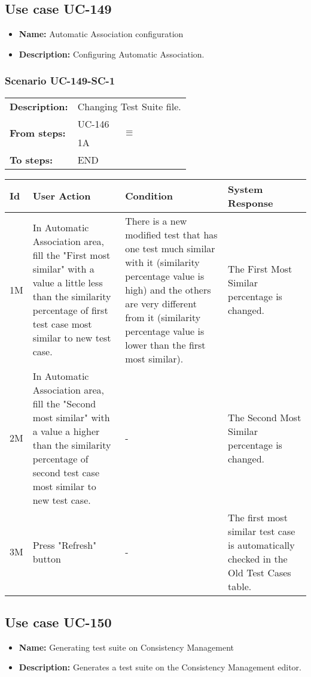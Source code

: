 \documentclass[a4paper,11pt]{article}
\newcommand{\bl}{\\ \hline}
\begin{document}
\subsection*{Use case UC-149}
\begin{itemize}
\item {\bf Name: }Automatic Association configuration
\item {\bf Description: }Configuring Automatic Association.
\end{itemize}
\subsubsection*{Scenario UC-149-SC-1}
\begin{tabular}{p{1in}p{4in}}
{\bf Description:} & Changing Test Suite file. \\
{\bf From steps:} & UC-146$$\equiv$$1A \\
{\bf To steps:} & END \\
\end{tabular}
 
\begin{tabular}{|p{0.8in}|p{1.6in}|p{1.6in}|p{1.6in}|}
\hline
Id & User Action & Condition & System Response  \bl 
1M & In Automatic Association area, fill the "First most similar" with a value a little less than the similarity percentage of first test case most similar to new test case. & There is a new modified test that has one test much similar with it (similarity percentage value is high) and the others are very different from it (similarity percentage value is lower than the first most similar). & The First Most Similar percentage is changed. \bl 
2M & In Automatic Association area, fill the "Second most similar" with a value a higher than the similarity percentage of second test case most similar to new test case. & - & The Second Most Similar percentage is changed. \bl 
3M & Press "Refresh" button & - & The first most similar test case is automatically checked in the Old Test Cases table. \bl 
\end{tabular}
\subsection*{Use case UC-150}
\begin{itemize}
\item {\bf Name: }Generating test suite on Consistency Management
\item {\bf Description: }Generates a test suite on the Consistency Management editor.
\end{itemize}
\end{document}
